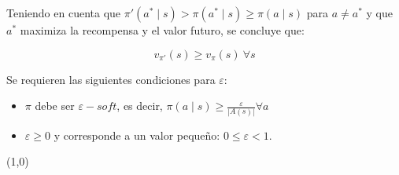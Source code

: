 Teniendo en cuenta que $\pi'(a^{\ast} \mid s) > \pi(a^{\ast} \mid s) \geq \pi(a \mid s)$ para $a \neq a^{\ast}$ y que $a^{\ast}$ maximiza la recompensa y el valor futuro, se concluye que:

\[
     v_{\pi'}(s) \geq v_{\pi}(s) \ \forall s
\]

Se requieren las siguientes condiciones para $\varepsilon$:

\begin{itemize}
    \item $\pi$ debe ser $\varepsilon -\textit{soft}$, es decir, $\pi(a \mid s) \geq \frac{\varepsilon}{|A(s)|} \forall a$
    \item $\varepsilon \geq 0$ y corresponde a un valor pequeño: $0 \leq \varepsilon < 1$.
\end{itemize}


\line(1,0){\textwidth}
